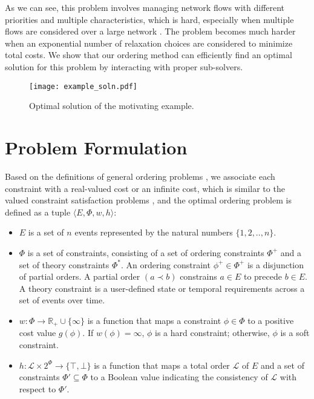 \documentclass[letterpaper]{article} %
\theoremstyle{definition}
\newcommand{\LE}{\mathcal{L}}
\begin{document}
As we can see, this problem involves managing network flows with different priorities and multiple characteristics, which is hard, especially when multiple flows are considered over a large network \cite{chen2018radmax}. The problem becomes much harder when an exponential number of relaxation choices are considered to minimize total costs. We show that our ordering method can efficiently find an optimal solution for this problem by interacting with proper sub-solvers.


\begin{figure}[t]
\centering
\texttt{[image: example\_soln.pdf]}
\caption{Optimal solution of the motivating example.}
\label{fig:example_soln}
\end{figure}

\section{Problem Formulation}
\label{sec:def}
Based on the definitions of general ordering problems \cite{chen2019efficiently}, we associate each constraint with a real-valued cost or an infinite cost, which is similar to the valued constraint satisfaction problems \cite{schiex1995valued}, and the optimal ordering problem is defined as a tuple $\langle E, \Phi, w, h \rangle$:
\begin{itemize}
    \item $E$ is a set of $n$ events represented by the natural numbers $\{1,2,..,n\}$.
    
    \item $\Phi$ is a set of constraints, consisting of a set of ordering constraints $\Phi^+$ and a set of theory constraints $\Phi^*$. An ordering constraint $\phi^+ \in \Phi^+$ is a disjunction of partial orders. A partial order $(a \prec b)$ constrains $a \in E$ to precede $b \in E$. A theory constraint is a user-defined state or temporal requirements across a set of events over time.
    
    \item  $w: \Phi \rightarrow \mathbb{R}_+ \cup \{\infty\}$ is a function that maps a constraint $\phi \in \Phi$ to a positive cost value $g(\phi) $. If $w(\phi) = \infty$, $\phi$ is a hard constraint; otherwise, $\phi$ is a soft constraint.

    \item $h: \LE \times  2^\Phi \rightarrow \{\top, \bot\}$ is a function that maps a total order $\LE$ of $E$ and a set of constraints $\Phi' \subseteq \Phi$ to a Boolean value indicating the consistency of $\LE$ with respect to $\Phi'$.
    
\end{itemize}
\end{document}
